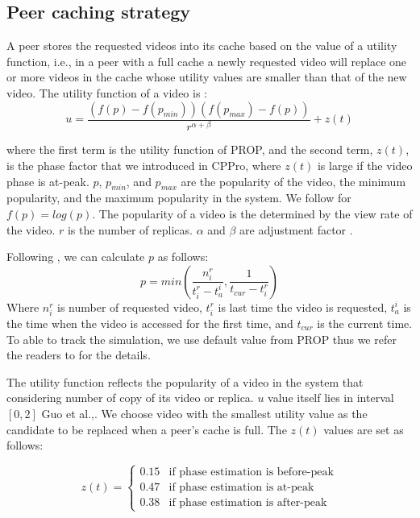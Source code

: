 \subsection{Peer caching strategy}\label{peercachingstrategy}

A peer stores the requested videos into its cache based on the value of a utility function, i.e., in a peer with a full cache a newly requested video will replace one or more videos in the cache whose utility values are smaller than that of the new video.
The utility function of a video is :
\begin{equation}
u = \frac{ (f(p) - f(p_{min})) (f(p_{max}) - f(p)) }{r^{\alpha + \beta}} + z(t)
\end{equation}

where the first term is the utility function of PROP, and the second term, $z(t)$, is the phase factor that we introduced in CPPro, where $z(t)$ is large if the video phase is at-peak.
$p$, $p_{min}$, and $p_{max}$ are the popularity of the video, the minimum popularity, and the maximum popularity in the system.
We follow \cite{1613869} for $f(p) = log(p)$.
The popularity of a video is the determined by the view rate of the video.
$r$ is the number of replicas. 
$\alpha$ and $\beta$ are adjustment factor \cite{1613869}.

Following \cite{1613869}, we can calculate $p$ as follows:
\begin{equation}
p = min \left(\frac{n_i^r}{t_i^r - t_a^i}  , \frac{1}{t_{cur} - t_i^r}\right)
\end{equation}
Where $n_i^r$ is number of requested video, $t_i^r$ is last time the video is requested, $t_a^i$ is the time when the video is accessed for the first time, and $t_{cur}$ is the current time.
To able to track the simulation, we use default value from PROP thus we refer the readers to \cite{1613869} for the details.

The utility function reflects the popularity of a video in the system that considering number of copy of its video or replica. 
$u$ value itself lies in interval $[0,2]$ Guo et al.,\cite{1613869}.
We choose video with the smallest utility value as the candidate to be replaced when a peer's cache is full.
The $z(t)$ values are set as follows:


\begin{equation}
 z(t) = 
  \begin{cases}
   0.15 & \text{if phase estimation is before-peak} \\
   0.47 & \text{if phase estimation is at-peak} \\
   0.38 & \text{if phase estimation is after-peak}
  \end{cases}
\end{equation}\label{eq:zfactor}


